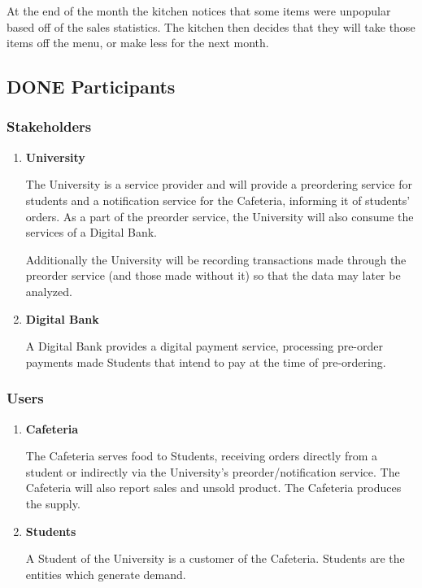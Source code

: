 \documentclass[11pt]{article}
\begin{document}
At the end of the month the kitchen notices that some items were
unpopular based off of the sales statistics. The kitchen then
decides that they will take those items off the menu, or make less
for the next month.
\subsection{{\bfseries\sffamily DONE} Participants}
\label{sec:org4a98e47}
\subsubsection{Stakeholders}
\label{sec:orgbe00546}
\begin{enumerate}
\item \textbf{University}
\label{sec:org3facc3d}

The University is a service provider and will provide a
preordering service for students and a notification service for
the Cafeteria, informing it of students' orders. As a part of the
preorder service, the University will also consume the services
of a Digital Bank.

Additionally the University will be recording transactions made
through the preorder service (and those made without it) so that
the data may later be analyzed.

\item \textbf{Digital Bank}
\label{sec:org9a2d786}

A Digital Bank provides a digital payment service, processing
pre-order payments made Students that intend to pay at the time
of pre-ordering.
\end{enumerate}

\subsubsection{Users}
\label{sec:org988dcfe}
\begin{enumerate}
\item \textbf{Cafeteria}
\label{sec:orgab31635}

The Cafeteria serves food to Students, receiving orders directly
from a student or indirectly via the University's
preorder/notification service. The Cafeteria will also report
sales and unsold product. The Cafeteria produces the supply.

\item \textbf{Students}
\label{sec:orga8d9ab0}

A Student of the University is a customer of the
Cafeteria. Students are the entities which generate demand.
\end{enumerate}
\end{document}

